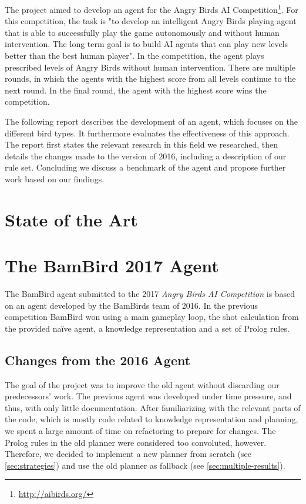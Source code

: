 \documentclass[a4paper, pdftex, ngerman]{article}
\begin{document}
The project aimed to develop an agent for the Angry Birds AI Competition\footnote{\url{http://aibirds.org/}}. For this competition, the task is "to develop an intelligent Angry Birds playing agent that is able to successfully play the game autonomously and without human intervention. The long term goal is to build AI agents that can play new levels better than the best human player". In the competition, the agent plays prescribed levels of Angry Birds without human intervention. There are multiple rounds, in which the agents with the highest score from all levels continue to the next round. In the final round, the agent with the highest score wins the competition.

The following report describes the development of an agent, which focuses on the different bird types. It furthermore evaluates the effectiveness of this approach. The report first states the relevant research in this field we researched, then details the changes made to the version of 2016, including a description of our rule set. Concluding we discuss a benchmark of the agent and propose further work based on our findings.

\newpage
\section{State of the Art}


\newpage
\section{The BamBird 2017 Agent}

The BamBird agent submitted to the 2017 \emph{Angry Birds AI Competition} is
based on an agent developed by the BamBirds team of 2016.  In the previous
competition BamBird won using a main gameplay loop, the shot calculation from the provided naïve agent, a knowledge representation and a set of Prolog rules.

\subsection{Changes from the 2016 Agent}

The goal of the project was to improve the old agent without discarding our predecessors'
work. The previous agent was developed under time pressure, and thus, with only little
documentation. After familiarizing with the relevant parts of the code, which is mostly code related to knowledge representation and planning,
we spent a large amount of time on refactoring to prepare for changes. The
Prolog rules in the old planner were considered too convoluted, however.
Therefore, we decided to implement a new planner from scratch (see
\ref{sec:strategies}) and use the old planner as fallback (see \ref{sec:multiple-results}).
\end{document}
